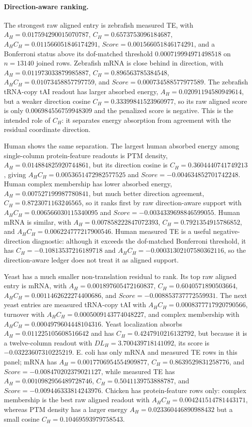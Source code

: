 \paragraph{Direction-aware ranking.}
The strongest raw aligned entry is zebrafish measured TE, with $A_H=0.017594290015070787$, $C_H=0.6573753096184687$, $A_HC_H=0.011566051846174291$, $Score=0.001566051846174291$, and a Bonferroni status above its dof-matched threshold $0.000719994971498518$ on $n=13140$ joined rows.  Zebrafish mRNA is close behind in direction, with $A_H=0.011973033879985887$, $C_H=0.896563785384548$, $A_HC_H=0.01073458857797759$, and $Score=0.000734588577977589$.  The zebrafish tRNA-copy tAI readout has larger absorbed energy, $A_H=0.02091194580949614$, but a weaker direction cosine $C_H=0.33399841523960977$, so its raw aligned score is only $0.006984556759948309$ and the penalized score is negative.  This is the intended role of $C_H$: it separates energy absorption from agreement with the residual coordinate direction.

Human shows the same separation.  The largest human absorbed energy among single-column protein-feature readouts is PTM density, $A_H=0.014884825920744861$, but its direction cosine is $C_H=0.3604440741749213$, giving $A_HC_H=0.0053651472982577525$ and $Score=-0.004634852701742248$.  Human complex membership has lower absorbed energy, $A_H=0.007527199987780841$, but much better direction agreement, $C_H=0.8723071163246565$, so it ranks first by raw direction-aware support with $A_HC_H=0.006566030115340095$ and $Score=-0.0034339698846599055$.  Human mRNA is similar, with $A_H=0.007858222847072393$, $C_H=0.7921354915786852$, and $A_HC_H=0.006224777217900546$.  Human measured TE is a useful negative-direction diagnostic: although it exceeds the dof-matched Bonferroni threshold, it has $C_H=-0.10813537216189718$ and $A_HC_H=-0.00031302107580362116$, so the direction-aware ledger does not treat it as aligned support.

Yeast has a much smaller non-translation residual to rank.  Its top raw aligned entry is mRNA, with $A_H=0.001897605472160837$, $C_H=0.6040571890503664$, $A_HC_H=0.0011462622274400686$, and $Score=-0.008853737772559931$.  The next yeast entries are measured tRNA-copy tAI with $A_HC_H=0.0008377717920790566$, turnover with $A_HC_H=0.0005009143774048227$, and complex membership with $A_HC_H=0.0004979604448104316$.  Yeast localization absorbs $A_H=0.011225105608516642$ and has $C_H=0.4247910216132792$, but because it is a twelve-column readout with $DL_H=3.700439718141092$, its score is $-0.03223607310225219$.  E. coli has only mRNA and measured TE rows in this panel; mRNA has $A_H=0.0017706954554909877$, $C_H=0.8639529831258776$, and $Score=-0.008470202379021127$, while measured TE has $A_H=0.0010982956489728746$, $C_H=0.5041139753888787$, and $Score=-0.009446333814243976$.  Chicken has protein-feature rows only: complex membership is the best raw aligned readout with $A_HC_H=0.004241514781443171$, whereas PTM density has a larger energy $A_H=0.023360446890988432$ but a small cosine $C_H=0.10469593979758543$.

